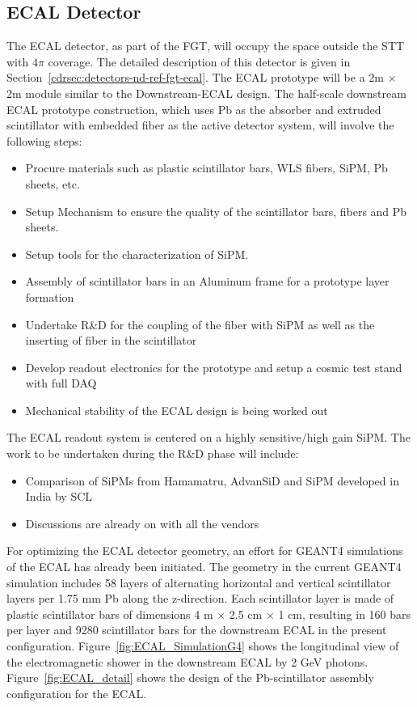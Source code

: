 \subsection{ECAL Detector} 


The ECAL detector, as part of the FGT, will occupy the space outside the STT with $4\pi$ coverage. 
The detailed description of this detector is given in Section~\ref{cdrsec:detectors-nd-ref-fgt-ecal}. 
The ECAL prototype will be a 2m $\times$ 2m module similar to the Downstream-ECAL design. 
The half-scale downstream ECAL prototype construction, which uses Pb as the absorber and extruded 
scintillator with embedded fiber as the active detector system, will involve the following steps:

\begin{itemize} 
\item Procure materials such as plastic scintillator bars, WLS fibers, SiPM, Pb sheets, etc.
\item Setup Mechanism to ensure the quality of the scintillator bars, fibers and Pb sheets.
\item Setup tools for the characterization of SiPM.
\item Assembly of scintillator bars in an Aluminum frame for a prototype layer formation
\item Undertake R\&D for the coupling of the fiber with SiPM as well as the inserting of fiber in the scintillator
\item Develop readout electronics for the prototype and setup a cosmic test stand with full DAQ
\item Mechanical stability of the ECAL design is being worked out
\end{itemize} 

The ECAL readout system is centered on a highly sensitive/high gain SiPM. The work to be undertaken 
during the R\&D phase will include:
\begin{itemize}
\item Comparison of SiPMs from Hamamatru, AdvanSiD and SiPM developed in India by SCL
\item Discussions are already on with all the vendors
\end{itemize} 

For optimizing the ECAL detector geometry, an effort for GEANT4 simulations of the ECAL has already been 
initiated. The geometry in the current GEANT4 simulation includes 58 layers of alternating horizontal and 
vertical scintillator layers per 1.75 mm Pb along the z-direction. Each scintillator layer is made of 
plastic scintillator bars of dimensions 4 m $\times$ 2.5 cm $\times$ 1 cm, resulting in 160 bars per 
layer and 9280 scintillator bars for the downstream ECAL in the present configuration.  
Figure~\ref{fig:ECAL_SimulationG4} shows the longitudinal view of the electromagnetic shower in the 
downstream ECAL by 2 GeV photons. Figure~\ref{fig:ECAL_detail} shows the design of the Pb-scintillator 
assembly configuration for the ECAL.
 
